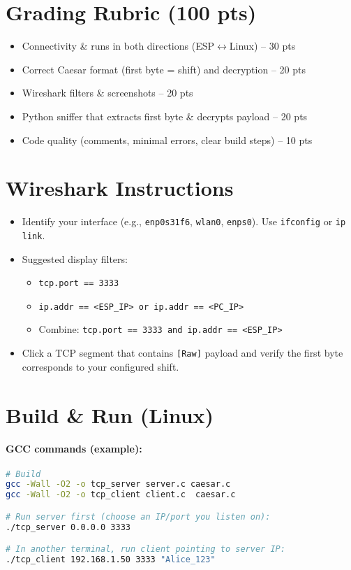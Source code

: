 \documentclass[11pt]{article}
\begin{document}
\section*{Grading Rubric (100 pts)}
\begin{itemize}
  \item Connectivity \& runs in both directions (ESP$\leftrightarrow$Linux) -- 30 pts
  \item Correct Caesar format (first byte = shift) and decryption -- 20 pts
  \item Wireshark filters \& screenshots -- 20 pts
  \item Python sniffer that extracts first byte \& decrypts payload -- 20 pts
  \item Code quality (comments, minimal errors, clear build steps) -- 10 pts
\end{itemize}

\section*{Wireshark Instructions}
\begin{itemize}
  \item Identify your interface (e.g., \texttt{enp0s31f6}, \texttt{wlan0}, \texttt{enps0}). Use \texttt{ifconfig} or \texttt{ip link}.
  \item Suggested display filters:
  \begin{itemize}
    \item \texttt{tcp.port == 3333}
    \item \texttt{ip.addr == \textless ESP\_IP\textgreater\ or ip.addr == \textless PC\_IP\textgreater}
    \item Combine: \texttt{tcp.port == 3333 and ip.addr == \textless ESP\_IP\textgreater}
  \end{itemize}
  \item Click a TCP segment that contains \texttt{[Raw]} payload and verify the first byte corresponds to your configured shift.
\end{itemize}

\section*{Build \& Run (Linux)}
\paragraph{GCC commands (example):}
\begin{lstlisting}[language=bash]
# Build
gcc -Wall -O2 -o tcp_server server.c caesar.c
gcc -Wall -O2 -o tcp_client client.c  caesar.c

# Run server first (choose an IP/port you listen on):
./tcp_server 0.0.0.0 3333

# In another terminal, run client pointing to server IP:
./tcp_client 192.168.1.50 3333 "Alice_123"
\end{lstlisting}
\end{document}
